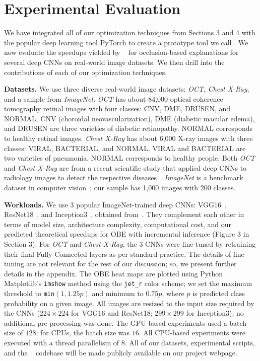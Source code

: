 \section{Experimental Evaluation}
We have integrated all of our optimization techniques from Sections 3 and 4 with the popular deep learning tool PyTorch to create a prototype tool we call \system.
We now evaluate the speedups yielded by \system~ for occlusion-based explanations for several deep CNNs on real-world image datasets.
We then drill into the contributions of each of our optimization techniques.

\vspace{2mm}
\noindent \textbf{Datasets.}
We use three diverse real-world image datasets: \textit{OCT}, \textit{Chest X-Ray}, and a sample from \textit{ImageNet}. \textit{OCT} has about 84,000 optical coherence tomography retinal images with four classes: CNV, DME, DRUSEN, and NORMAL. CNV (choroidal neovascularization), DME (diabetic macular edema), and DRUSEN are three varieties of diabetic retinopathy. NORMAL corresponds to healthy retinal images. \textit{Chest X-Ray} has about 6,000 X-ray images with three classes: VIRAL, BACTERIAL, and NORMAL. VIRAL and BACTERIAL are two varieties of pneumonia. NORMAL corresponds to healthy people. Both \textit{OCT} and \textit{Chest X-Ray} are from a recent scientific study that applied deep CNNs to radiology images to detect the respective diseases~\cite{kermany2018identifying}. \textit{ImageNet} is a benchmark dataset in computer vision~\cite{deng2009imagenet}; our sample has 1,000 images with 200 classes.

\vspace{2mm}
\noindent \textbf{Workloads.}
We use 3 popular ImageNet-trained deep CNNs: VGG16~\cite{vggnet}, ResNet18~\cite{resnet}, and Inception3~\cite{inception}, obtained from~\cite{torchvisionmodels}. They complement each other in terms of model size, architecture complexity, computational cost, and our predicted theoretical speedups for OBE with incremental inference (Figure 3 in Section 3). For \textit{OCT} and \textit{Chest X-Ray}, the 3 CNNs were fine-tuned by retraining their final Fully-Connected layers as per standard practice. The details of fine-tuning are not relevant for the rest of our discussion; so, we present further details in the appendix. The OBE heat maps are plotted using Python Matplotlib's \texttt{imshow} method using the \texttt{jet\_r} color scheme; we set the maximum threshold to \texttt{min}$(1, 1.25 p)$ and minimum to $0.75 p$, where $p$ is predicted class probability on a given image. All images are resized to the input size required by the CNNs ($224\times224$ for VGG16 and ResNet18; $299\times299$ for Inception3); no additional pre-processing was done. The GPU-based experiments used a batch size of $128$; for CPUs, the batch size was $16$. All CPU-based experiments were executed with a thread parallelism of $8$. All of our datasets, experimental scripts, and the \system~ codebase will be made publicly available on our project webpage.

